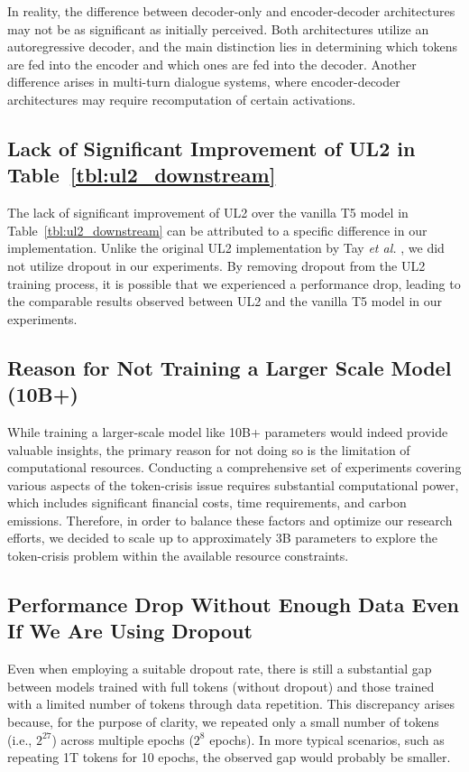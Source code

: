 \documentclass{article}
\begin{document}
In reality, the difference between decoder-only and encoder-decoder architectures may not be as significant as initially perceived. Both architectures utilize an autoregressive decoder, and the main distinction lies in determining which tokens are fed into the encoder and which ones are fed into the decoder. Another difference arises in multi-turn dialogue systems, where encoder-decoder architectures may require recomputation of certain activations.

\subsection{Lack of Significant Improvement of UL2 in Table~\ref{tbl:ul2_downstream}}

The lack of significant improvement of UL2 over the vanilla T5 model in Table~\ref{tbl:ul2_downstream} can be attributed to a specific difference in our implementation. Unlike the original UL2 implementation by Tay \textit{et al.} \cite{tay2022unifying}, we did not utilize dropout in our experiments. By removing dropout from the UL2 training process, it is possible that we experienced a performance drop, leading to the comparable results observed between UL2 and the vanilla T5 model in our experiments.

\subsection{Reason for Not Training a Larger Scale Model (10B+)}

While training a larger-scale model like 10B+ parameters would indeed provide valuable insights, the primary reason for not doing so is the limitation of computational resources. Conducting a comprehensive set of experiments covering various aspects of the token-crisis issue requires substantial computational power, which includes significant financial costs, time requirements, and carbon emissions. Therefore, in order to balance these factors and optimize our research efforts, we decided to scale up to approximately 3B parameters to explore the token-crisis problem within the available resource constraints.

\subsection{Performance Drop Without Enough Data Even If We Are Using Dropout}

Even when employing a suitable dropout rate, there is still a substantial gap between models trained with full tokens (without dropout) and those trained with a limited number of tokens through data repetition. This discrepancy arises because, for the purpose of clarity, we repeated only a small number of tokens (i.e., $2^{27}$) across multiple epochs ($2^8$ epochs). In more typical scenarios, such as repeating 1T tokens for 10 epochs, the observed gap would probably be smaller.
\end{document}
